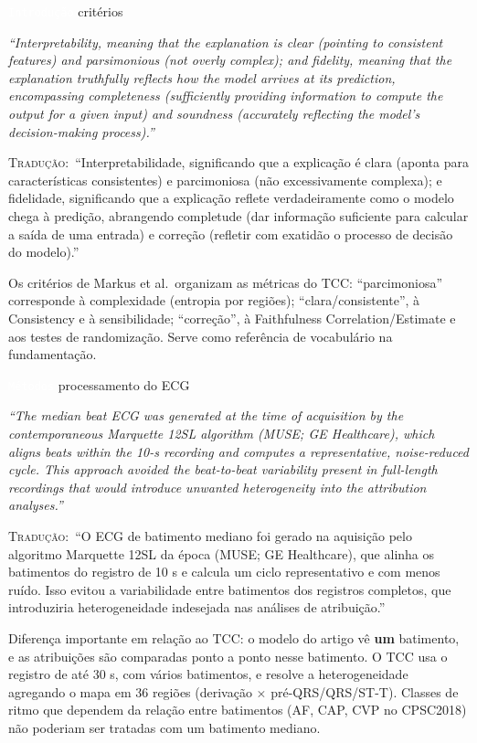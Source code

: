 \documentclass[11pt,a4paper]{article}
\newcommand{\pagechip}[1]{{\setlength{\fboxsep}{1.5pt}\colorbox{cAcc}{\textcolor{white}{\scriptsize\texttt{#1}}}}}
\newenvironment{origquote}{\par\itshape\small}{\par}
\newenvironment{tradquote}{\par\small\textsc{Tradução:}\ }{\par}
\newcommand{\explab}[1]{\par\smallskip{\small\color{cAcc}\textbf{\MakeUppercase{#1}}}\par}
\begin{document}
\begin{citacard}{\pagechip{Introdução} critérios}
\begin{origquote}“Interpretability, meaning that the explanation is clear (pointing to consistent features) and parsimonious (not overly complex); and fidelity, meaning that the explanation truthfully reflects how the model arrives at its prediction, encompassing completeness (sufficiently providing information to compute the output for a given input) and soundness (accurately reflecting the model’s decision-making process).”\end{origquote}
\begin{tradquote}“Interpretabilidade, significando que a explicação é clara (aponta para características consistentes) e parcimoniosa (não excessivamente complexa); e fidelidade, significando que a explicação reflete verdadeiramente como o modelo chega à predição, abrangendo completude (dar informação suficiente para calcular a saída de uma entrada) e correção (refletir com exatidão o processo de decisão do modelo).”\end{tradquote}
\explab{Explicação}
Os critérios de Markus et al.\ organizam as métricas do TCC: “parcimoniosa” corresponde à complexidade (entropia por regiões); “clara/consistente”, à Consistency e à sensibilidade; “correção”, à Faithfulness Correlation/Estimate e aos testes de randomização. Serve como referência de vocabulário na fundamentação.
\end{citacard}

\begin{citacard}{\pagechip{Métodos} processamento do ECG}
\begin{origquote}“The median beat ECG was generated at the time of acquisition by the contemporaneous Marquette 12SL algorithm (MUSE; GE Healthcare), which aligns beats within the 10-s recording and computes a representative, noise-reduced cycle. This approach avoided the beat-to-beat variability present in full-length recordings that would introduce unwanted heterogeneity into the attribution analyses.”\end{origquote}
\begin{tradquote}“O ECG de batimento mediano foi gerado na aquisição pelo algoritmo Marquette 12SL da época (MUSE; GE Healthcare), que alinha os batimentos do registro de 10 s e calcula um ciclo representativo e com menos ruído. Isso evitou a variabilidade entre batimentos dos registros completos, que introduziria heterogeneidade indesejada nas análises de atribuição.”\end{tradquote}
\explab{Explicação}
Diferença importante em relação ao TCC: o modelo do artigo vê \textbf{um} batimento, e as atribuições são comparadas ponto a ponto nesse batimento. O TCC usa o registro de até 30 s, com vários batimentos, e resolve a heterogeneidade agregando o mapa em 36 regiões (derivação $\times$ pré-QRS/QRS/ST-T). Classes de ritmo que dependem da relação entre batimentos (AF, CAP, CVP no CPSC2018) não poderiam ser tratadas com um batimento mediano.
\end{citacard}
\end{document}
